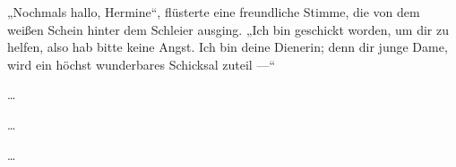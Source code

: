 „Nochmals hallo, Hermine“, flüsterte eine freundliche Stimme, die von dem weißen Schein hinter dem Schleier ausging.
„Ich bin geschickt worden, um dir zu helfen, also hab bitte keine Angst. Ich bin deine Dienerin; denn dir junge Dame, wird ein höchst wunderbares Schicksal zuteil —“

\begin{center}
…

…

…
\end{center}

